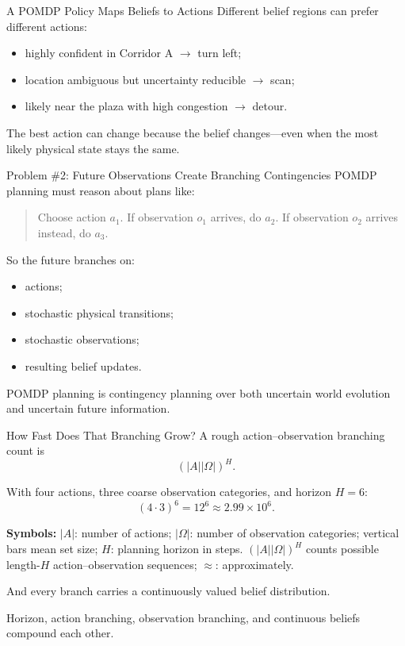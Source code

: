 \documentclass[aspectratio=169,10pt]{beamer}
\newcommand{\equationlegend}[1]{%
  \par\smallskip
  \begingroup
    \setlength{\fboxsep}{4pt}%
    \noindent\colorbox{DeckSoft}{%
      \parbox{\dimexpr\linewidth-2\fboxsep\relax}{%
        \footnotesize\textbf{Symbols:} #1%
      }%
    }\par
  \endgroup
  \smallskip
}
\begin{document}
\begin{frame}[shrink=10]{A POMDP Policy Maps Beliefs to Actions}
  Different belief regions can prefer different actions:
  \begin{itemize}
    \item highly confident in Corridor A $\rightarrow$ turn left;
    \item location ambiguous but uncertainty reducible $\rightarrow$ scan;
    \item likely near the plaza with high congestion $\rightarrow$ detour.
  \end{itemize}

  \begin{keyidea}
    The best action can change because the belief changes---even when the most likely physical state stays the same.
  \end{keyidea}
\end{frame}

\begin{frame}[shrink=10]{Problem \#2: Future Observations Create Branching Contingencies}
  POMDP planning must reason about plans like:
  \begin{quote}
    Choose action $a_1$. If observation $o_1$ arrives, do $a_2$. If observation $o_2$ arrives instead, do $a_3$.
  \end{quote}

  So the future branches on:
  \begin{itemize}
    \item actions;
    \item stochastic physical transitions;
    \item stochastic observations;
    \item resulting belief updates.
  \end{itemize}

  \begin{keyidea}
    POMDP planning is contingency planning over both uncertain world evolution and uncertain future information.
  \end{keyidea}
\end{frame}

\begin{frame}[shrink=10]{How Fast Does That Branching Grow?}
  A rough action--observation branching count is
  \[
    (|A||\Omega|)^H.
  \]

  With four actions, three coarse observation categories, and horizon $H=6$:
  \[
    (4\cdot3)^6=12^6\approx2.99\times10^6.
  \]
  \equationlegend{$|A|$: number of actions; $|\Omega|$: number of observation categories; vertical bars mean set size; $H$: planning horizon in steps. $(|A||\Omega|)^H$ counts possible length-$H$ action--observation sequences; $\approx$: approximately.}

  And every branch carries a continuously valued belief distribution.

  \begin{keyidea}
    Horizon, action branching, observation branching, and continuous beliefs compound each other.
  \end{keyidea}
\end{frame}
\end{document}
